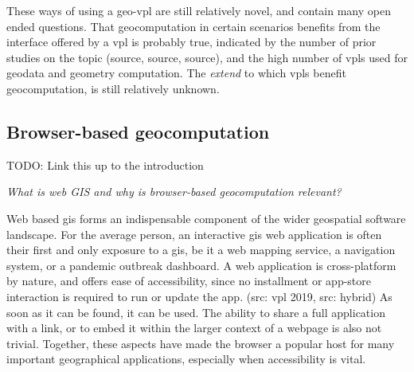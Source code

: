 These ways of using a \ac{geo-vpl} are still relatively novel, and contain many open ended questions. That geocomputation in certain scenarios benefits from the interface offered by a \ac{vpl} is probably true, indicated by the number of prior studies on the topic (source, source, source), and the high number of \ac{vpl}s used for geodata and geometry computation. The \emph{extend} to which \ac{vpl}s benefit geocomputation, is still relatively unknown. 









\subsection*{Browser-based geocomputation}

\begin{note}
TODO: Link this up to the introduction
\end{note}

\emph{What is web GIS and why is browser-based geocomputation relevant?}

Web based \ac{gis} forms an indispensable component of the wider geospatial software landscape. 
For the average person, an interactive \ac{gis} web application is often their first and only exposure to a \acs{gis}, be it a web mapping service, a navigation system, or a pandemic outbreak dashboard. 
A web application is cross-platform by nature, and offers ease of accessibility, since no installment or app-store interaction is required to run or update the app. (src: vpl 2019, src: hybrid)
As soon as it can be found, it can be used.
The ability to share a full application with a link, or to embed it within the larger context of a webpage is also not trivial. 
Together, these aspects have made the browser a popular host for many important geographical applications, especially when accessibility is vital.


